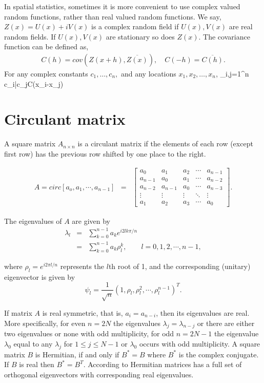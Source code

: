 In spatial statistics, sometimes it is more convenient to use complex valued random functions, rather than real valued random functions. We say, $Z(x)=U(x) + i V(x)$ is a complex random field if $U(x),V(x)$ are real random fields. If $U(x),V(x)$ are stationary so does $Z(x)$. The covariance function can be defined as,
\begin{eqnarray*}
	C(h) = cov(Z(x+h), \overline{Z(x)}), \quad C(-h)=\overline{C(h)}.
\end{eqnarray*}
For any complex constants $c_1,\ldots, c_n,$ and any locations $x_1, x_2, \ldots, x_n$,
\beq
\sum_{i,j=1}^n c_i\bar{c_j}C(x_i-x_j)
\eeq

\section{Circulant matrix}

A square matrix $A_{n\times n}$ is a circulant matrix if the elements of each row (except first row) has the previous row shifted by one place to the right.

\begin{eqnarray}
	A = circ[a_o, a_1,\cdots,a_{n-1}] &=& \left[
		\begin{array}{lllll}
			a_0     & a_1     & a_2    & \cdots & a_{n-1} \\
			a_{n-1} & a_0     & a_1    & \cdots & a_{n-2} \\
			a_{n-2} & a_{n-1} & a_0    & \cdots & a_{n-3} \\
			\vdots  & \vdots  & \vdots & \ddots & \vdots  \\
			a_1     & a_2     & a_3    & \cdots & a_0
		\end{array}
	\right].
\end{eqnarray}

The eigenvalues of $A$ are given by
\begin{eqnarray*}
	\lambda_l & = & \sum_{k=0}^{n-1} a_k e^{i2lk\pi/n} \\
	& = & \sum_{k=0}^{n-1}a_k \rho_l^k, \quad \quad l = 0, 1, 2, \cdots, n-1,
\end{eqnarray*}

where $\rho_l = e^{i2\pi l/n}$ represents the $l$th root of 1, and the corresponding (unitary) eigenvector is given by
\[
	\psi_l = \frac{1}{\sqrt{n}}(1, \rho_l, \rho_l^2, \cdots, \rho_l^{n-1})^T.
\]

If matrix $A$ is real symmetric, that is, $a_i = a_{n-i}$, then its eigenvalues are real. More specifically, for even $n=2N$ the eigenvalues $\lambda_j = \lambda_{n-j}$ or there are either two eigenvalues or none with odd multiplicity, for odd $n=2N-1$ the eigenvalue $\lambda_0$ equal to any $\lambda_j$ for $1\le j \le N-1$ or $\lambda_0$ occurs with odd multiplicity. A square matrix $B$ is Hermitian, if and only if $B^* = B$ where $B^*$ is the complex conjugate. If $B$ is real then $B^* = B^T$. According to \cite{Tee2005} Hermitian matrices has a full set of orthogonal eigenvectors with corresponding real eigenvalues.



